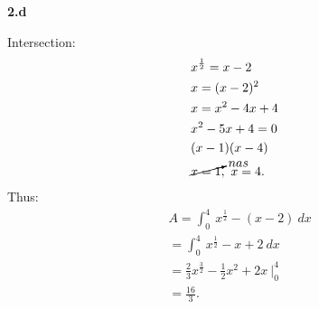\documentclass{report}
\begin{document}
    \bigbreak \noindent 
    \textbf{2.d}
    \bigbreak \noindent 
    \begin{minipage}[]{0.47\textwidth}
    \end{minipage}
    \begin{minipage}[]{0.47\textwidth}
        Intersection:
        \begin{align*}
            &x^{\frac{1}{2}} = x-2 \\
            &x = (x-2)^{2} \\
            &x = x^{2}-4x+4 \\
            &x^{2}-5x+4 = 0 \\
            &(x-1)(x-4) \\
            &\cancelto{nas}{x=1},\ x=4
        .\end{align*}
        \bigbreak \noindent 
        Thus:
        \begin{align*}
            &A = \int_{0}^{4}\ x^{\frac{1}{2}}-(x-2)\ dx \\
            &=\int_{0}^{4}\ x^{\frac{1}{2}}-x+2\ dx \\
            &= \frac{2}{3}x^{\frac{3}{2}}-\frac{1}{2}x^{2}+2x\ \bigg|_0^{4} \\
            &=\frac{16}{3}
        .\end{align*}
    \end{minipage}
\end{document}
